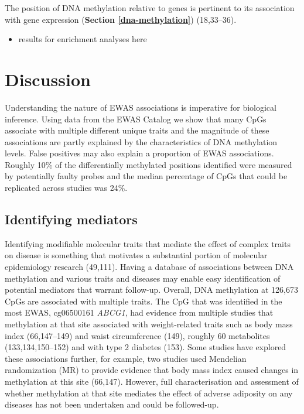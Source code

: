\documentclass[11pt,oneside]{bristolthesis}
\providecommand{\tightlist}{%
  \setlength{\itemsep}{0pt}\setlength{\parskip}{0pt}}
\begin{document}
The position of DNA methylation relative to genes is pertinent to its association with gene expression (\textbf{Section \ref{dna-methylation}}) (18,33--36).
\begin{itemize}
\tightlist
\item
  results for enrichment analyses here
\end{itemize}
\newpage

\hypertarget{discussion-04}{%
\section{Discussion}\label{discussion-04}}

Understanding the nature of EWAS associations is imperative for biological inference. Using data from the EWAS Catalog we show that many CpGs associate with multiple different unique traits and the magnitude of these associations are partly explained by the characteristics of DNA methylation levels. False positives may also explain a proportion of EWAS associations. Roughly 10\% of the differentially methylated positions identified were measured by potentially faulty probes and the median percentage of CpGs that could be replicated across studies was 24\%.

\hypertarget{identifying-mediators}{%
\subsection{Identifying mediators}\label{identifying-mediators}}

Identifying modifiable molecular traits that mediate the effect of complex traits on disease is something that motivates a substantial portion of molecular epidemiology research (49,111). Having a database of associations between DNA methylation and various traits and diseases may enable easy identification of potential mediators that warrant follow-up. Overall, DNA methylation at 126,673 CpGs are associated with multiple traits. The CpG that was identified in the most EWAS, cg06500161 \emph{ABCG1}, had evidence from multiple studies that methylation at that site associated with weight-related traits such as body mass index (66,147--149) and waist circumference (149), roughly 60 metabolites (133,134,150--152) and with type 2 diabetes (153). Some studies have explored these associations further, for example, two studies used Mendelian randomization (MR) to provide evidence that body mass index caused changes in methylation at this site (66,147). However, full characterisation and assessment of whether methylation at that site mediates the effect of adverse adiposity on any diseases has not been undertaken and could be followed-up.
\end{document}
